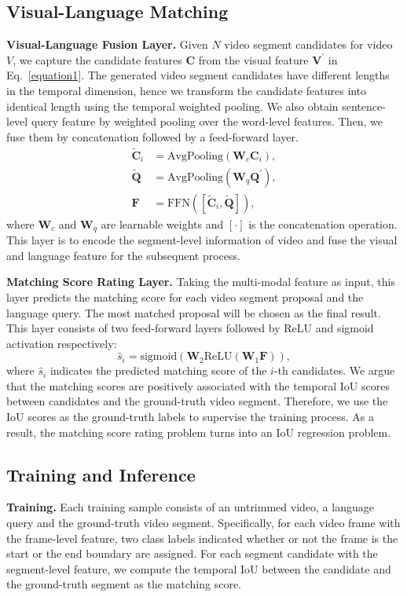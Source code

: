 \documentclass[letterpaper]{article} %
\begin{document}
\subsection{Visual-Language Matching}\label{VLM}
\textbf{Visual-Language Fusion Layer.}
Given $N$ video segment candidates for video $V$, we capture the candidate features
$\bm{C}$ from the visual feature $\bm{V}^{'}$ in Eq.~\eqref{equation1}.
The generated video segment candidates have different lengths in the temporal dimension,
hence we transform the candidate features into identical length using the temporal weighted pooling.
We also obtain sentence-level query feature by weighted pooling over the word-level features.
Then, we fuse them by concatenation followed by a feed-forward layer.
\begin{equation}
\begin{split}
\bm{\widetilde{C}}_{i}&= \text{AvgPooling}(\bm{W}_{c}\bm{C}_{i}), \\
\bm{\widetilde{Q}}&= \text{AvgPooling}(\bm{W}_{q}\bm{Q}^{'}), \\
\bm{F}&= \text{FFN}([\bm{\widetilde{C}}_{i},\bm{\widetilde{Q}}]),
\end{split}
\label{equation7}
\end{equation}
where $\bm{W}_{c}$ and $\bm{W}_{q}$ are learnable weights and
$[\cdot]$ is the concatenation operation.
This layer is to encode the segment-level information of video and fuse
the visual and language feature for the subsequent process.

\noindent\textbf{Matching Score Rating Layer.}
Taking the multi-modal feature as input, this layer predicts the matching score for each video segment proposal and the language query.
The most matched proposal will be chosen as the final result.
This layer consists of two feed-forward layers followed by ReLU and sigmoid activation respectively:
\begin{equation}
\hat{s}_{i} = \text{sigmoid}(\bm{W}_{2} \text{ReLU} (\bm{W}_{1}\bm{F})),
\label{equation8}
\end{equation}
where $\hat{s}_{i}$ indicates the predicted matching score of the $i$-th candidates.
We argue that the matching scores are positively associated with the temporal
IoU scores between candidates and the ground-truth video segment.
Therefore, we use the IoU scores as the ground-truth labels to supervise the training process.
As a result,
the matching score rating problem turns into an IoU regression problem.

\subsection{Training and Inference}\label{training}
\textbf{Training.} Each training sample consists of an untrimmed video, a language query and the ground-truth
video segment.
Specifically, for each video frame with the frame-level feature, two class labels indicated whether or not the
frame is the start or the end boundary are assigned.
For each segment candidate with the segment-level feature, we compute the temporal IoU between the
candidate and the ground-truth segment as the matching score.
\end{document}
